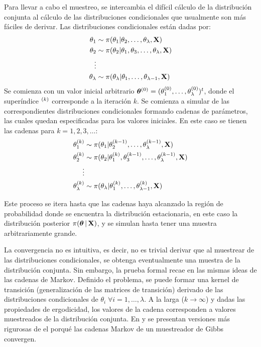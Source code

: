 \documentclass[../Main/Main.tex]{subfiles}
\begin{document}
Para llevar a cabo el muestreo, se intercambia el difícil cálculo de la distribución conjunta al cálculo de las distribuciones condicionales que usualmente son más fáciles de derivar. Las distribuciones condicionales están dadas por: 
\begin{align}
	\theta_1 &\sim \pi(\theta_1|\theta_2,\ldots,\theta_\lambda, \mathbf{X}) \label{ec:DistCondicionales}\\
	\theta_2 &\sim \pi(\theta_2|\theta_1,\theta_3,\ldots,\theta_\lambda, \mathbf{X})\nonumber \\ 
	\vdots \nonumber\\
	\theta_\lambda &\sim \pi(\theta_\lambda|\theta_1,\ldots,\theta_{\lambda-1}, \mathbf{X}) \nonumber
\end{align}
Se comienza con un valor inicial arbitrario $\bm{\theta}^{(0)} = (\theta_1^{(0)},\ldots,\theta_\lambda^{(0)})^t$, donde el superíndice $^{(k)}$ corresponde a la iteración $k$. Se comienza a simular de las correspondientes distribuciones condicionales formando cadenas de parámetros, las cuales quedan especificadas para los valores iniciales. En este caso se tienen las cadenas para $k = 1,2,3,\ldots$:
\begin{align}
	\theta_1^{(k)} &\sim \pi(\theta_1|\theta_2^{(k-1)},\ldots,\theta_\lambda^{(k-1)}, \mathbf{X}) \label{ec:GibbsSampler}\\
	\theta_2^{(k)} &\sim \pi(\theta_2|\theta_1^{(k)},\theta_3^{(k-1)},\ldots,\theta_\lambda^{(k-1)}, \mathbf{X})\nonumber \\ 
	\vdots \nonumber\\
	\theta_\lambda^{(k)} &\sim \pi(\theta_\lambda|\theta_1^{(k)},\ldots,\theta_{\lambda-1}^{(k)}, \mathbf{X}) \nonumber
\end{align}

Este proceso se itera hasta que las cadenas haya alcanzado la región de probabilidad donde se encuentra la distribución estacionaria, en este caso la distribución posterior $\pi(\bm{\theta} \,|\,\mathbf{X})$, y se simulan hasta tener una muestra arbitrariamente grande. 

La convergencia no es intuitiva, es decir, no es trivial derivar que al muestrear de las distribuciones condicionales, se obtenga eventualmente  una muestra de la distribución conjunta.  Sin embargo, la prueba formal recae en  las mismas ideas de las cadenas de Markov. Definido el problema, se puede formar una kernel de transición (generalización de las matrices de transición) derivado de las  distribuciones condicionales de $\theta_i\;\forall i = 1,\ldots,\lambda$. A la larga ($k \rightarrow \infty$) y dadas las propiedades de ergodicidad, los valores de la cadena corresponden a valores muestreados de la distribución conjunta. En \citet{casella1992explaing} y \citet{tierney1994markov} se presentan versiones más rigurosas de el porqué las cadenas Markov de un muestreador de Gibbs convergen. 
\end{document}
